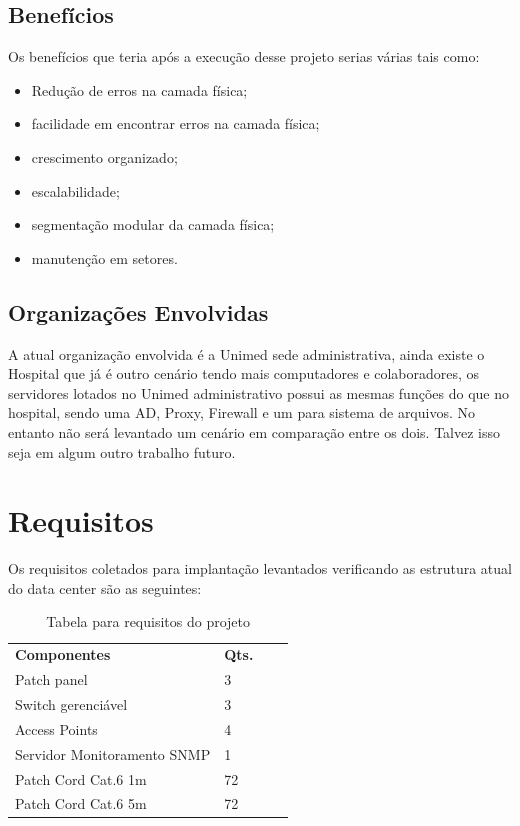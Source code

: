 \documentclass[	DIV=calc,%
							paper=a4,%
							fontsize=12pt,%
							onecolumn]{scrartcl}	 					%
\begin{document}
\subsection{Benefícios}
Os benefícios que teria após a execução desse projeto serias várias tais como: 

\begin{itemize}
	\item Redução de erros na camada física;
	\item facilidade em encontrar erros na camada física;
	\item crescimento organizado;
	\item escalabilidade;
	\item segmentação modular da camada física;
	\item manutenção em setores.
\end{itemize}
 
\subsection{Organizações Envolvidas}
A atual organização envolvida é a Unimed sede administrativa, ainda existe o Hospital que já é outro cenário tendo mais computadores e colaboradores, os servidores lotados no Unimed administrativo possui as mesmas funções do que no hospital, sendo uma AD, Proxy, Firewall e um para sistema de arquivos. No entanto não será levantado um cenário em comparação entre os dois. Talvez isso seja em algum outro trabalho futuro.


\section{Requisitos}\label{sec:Requisitos}
Os requisitos coletados para implantação levantados verificando as estrutura atual do data center são as seguintes: 
\begin{table}[!htbp]
	\centering
	\begin{tabular}{|l|l|ll}
		\cline{1-2}
		\textbf{Componentes}        & \textbf{Qts.} &  &   \\
		\cline{1-2}
		Patch panel        & 3    &  &   \\
		Switch gerenciável & 3    &  &   \\
		Access Points 	   & 4    &  &   \\
		Servidor Monitoramento SNMP 	   & 1    &  &   \\	
		Patch Cord Cat.6  1m	   & 72    &  &   \\
		Patch Cord Cat.6  5m	   & 72    &  &   \\
		\cline{1-2} 
	\end{tabular}
		\caption{Tabela para requisitos do projeto}\label{tab:requisitos}
\end{table}
\end{document}
